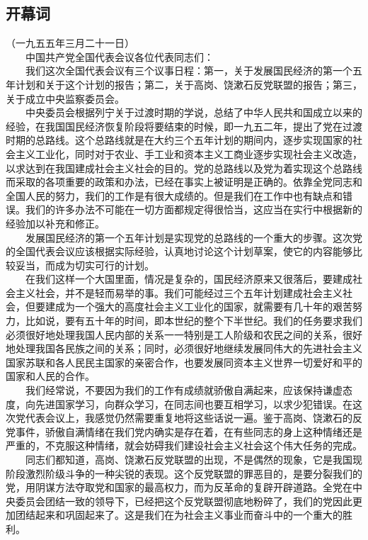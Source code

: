 \documentclass[cn,11pt,chinese]{elegantbook}
\def\myformat#1{\hfil\hfil #1}
\begin{document}
\subsection*{\myformat{开幕词}}
（一九五五年三月二十一日）\\
　　中国共产党全国代表会议各位代表同志们：\\
　　我们这次全国代表会议有三个议事日程：第一，关于发展国民经济的第一个五年计划和关于这个计划的报告；第二，关于高岗、饶漱石反党联盟的报告；第三，关于成立中央监察委员会。\\
　　中央委员会根据列宁关于过渡时期的学说，总结了中华人民共和国成立以来的经验，在我国国民经济恢复阶段将要结束的时候，即一九五二年，提出了党在过渡时期的总路线。这个总路线就是在大约三个五年计划的期间内，逐步实现国家的社会主义工业化，同时对于农业、手工业和资本主义工商业逐步实现社会主义改造，以求达到在我国建成社会主义社会的目的。党的总路线以及党为着实现这个总路线而采取的各项重要的政策和办法，已经在事实上被证明是正确的。依靠全党同志和全国人民的努力，我们的工作是有很大成绩的。但是我们在工作中也有缺点和错误。我们的许多办法不可能在一切方面都规定得很恰当，这应当在实行中根据新的经验加以补充和修正。\\
　　发展国民经济的第一个五年计划是实现党的总路线的一个重大的步骤。这次党的全国代表会议应该根据实际经验，认真地讨论这个计划草案，使它的内容能够比较妥当，而成为切实可行的计划。\\
　　在我们这样一个大国里面，情况是复杂的，国民经济原来又很落后，要建成社会主义社会，并不是轻而易举的事。我们可能经过三个五年计划建成社会主义社会，但要建成为一个强大的高度社会主义工业化的国家，就需要有几十年的艰苦努力，比如说，要有五十年的时间，即本世纪的整个下半世纪。我们的任务要求我们必须很好地处理我国人民内部的关系一一特别是工人阶级和农民之间的关系，很好地处理我国各民族之间的关系；同时，必须很好地继续发展同伟大的先进社会主义国家苏联和各人民民主国家的亲密合作，也要发展同资本主义世界一切爱好和平的国家和人民的合作。\\
　　我们经常说，不要因为我们的工作有成绩就骄傲自满起来，应该保持谦虚态度，向先进国家学习，向群众学习，在同志间也要互相学习，以求少犯错误。在这次党代表会议上，我感觉仍然需要重复地将这些话说一遍。鉴于高岗、饶漱石的反党事件，骄傲自满情绪在我们党内确实是存在着，在有些同志的身上这种情绪还是严重的，不克服这种情绪，就会妨碍我们建设社会主义社会这个伟大任务的完成。\\
　　同志们都知道，高岗、饶漱石反党联盟的出现，不是偶然的现象，它是我国现阶段激烈阶级斗争的一种尖锐的表现。这个反党联盟的罪恶目的，是要分裂我们的党，用阴谋方法夺取党和国家的最高权力，而为反革命的复辟开辟道路。全党在中央委员会团结一致的领导下，已经把这个反党联盟彻底地粉碎了，我们的党因此更加团结起来和巩固起来了。这是我们在为社会主义事业而奋斗中的一个重大的胜利。\\
\end{document}
